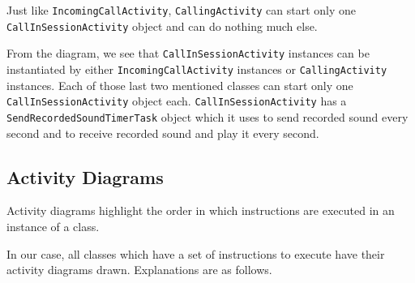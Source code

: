\documentclass[12pt,svgnames,smaller]{article} %
\begin{document}
	Just like \texttt{IncomingCallActivity}, \texttt{CallingActivity} can start only one \texttt{CallInSessionActivity} object and can do nothing much else.
	
	From the diagram, we see that \texttt{CallInSessionActivity} instances can be instantiated by either \texttt{IncomingCallActivity} instances or \texttt{CallingActivity} instances. Each of those last two mentioned classes can start only one \texttt{CallInSessionActivity} object each. \texttt{CallInSessionActivity} has a \texttt{SendRecordedSoundTimerTask} object which it uses to send recorded sound every second and to receive recorded sound and play it every second.
	
	
	\subsection{Activity Diagrams}
	
	Activity diagrams highlight the order in which instructions are executed in an instance of a class.
	
	In our case, all classes which have a set of instructions to execute have their activity diagrams drawn. Explanations are as follows.
	
\end{document}
